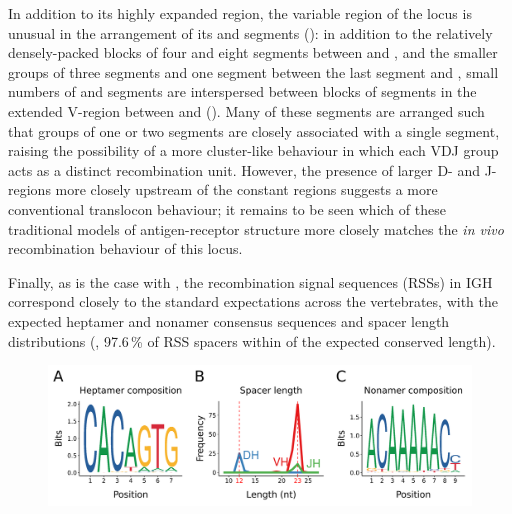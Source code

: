 In addition to its highly expanded \vh region, the variable region of the \Xma locus is unusual in the arrangement of its \dh and \jh segments (): in addition to the relatively densely-packed blocks of four \dh and eight \jh segments between  and , and the smaller groups of three \dh segments and one \jh segment between the last \vh segment and , small numbers of \dh and \jh segments are interspersed between blocks of \vh segments in the extended V-region between  and  (). Many of these segments are arranged such that groups of one or two \dh segments are closely associated with a single \jh segment, raising the possibility of a more cluster-like behaviour in which each VDJ group acts as a distinct recombination unit. However, the presence of larger D- and J-regions more closely upstream of the constant regions suggests a more conventional translocon behaviour; it remains to be seen which of these traditional models of antigen-receptor structure more closely matches the \textit{in vivo} recombination behaviour of this locus.
		
Finally, as is the case with \Nfu, the recombination signal sequences (RSSs) in \Xma IGH correspond closely to the standard expectations across the vertebrates, with the expected heptamer and nonamer consensus sequences and spacer length distributions (, 97.6\,\% of RSS spacers within  of the expected conserved length).	

	\begin{figure}
		\begin{subfigure}{0em}
        \label{fig:xma-rss-seqlogo-all-heptamer}
    \end{subfigure}
    \begin{subfigure}{0em}
        \label{fig:xma-rss-seqlogo-all-spacer}
    \end{subfigure}
    \begin{subfigure}{0em}
        \label{fig:xma-rss-seqlogo-all-nonamer}
    \end{subfigure}
	\includegraphics[width=\textwidth]{_Figures/png/xma-new-rss-seqlogo-all}
	\label{fig:xma-rss-seqlogo-all}
	\vspace{1em}
	\end{figure}
	
